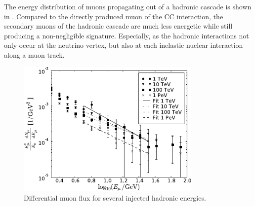 The energy distribution of muons propagating out of a hadronic cascade is shown in .
Compared to the directly produced muon of the CC interaction, the secondary muons of the hadronic cascade are much less energetic while still producing a non-negligible signature.
Especially, as the hadronic interactions not only occur at the neutrino vertex, but also at each inelastic nuclear interaction along a muon track.
\begin{figure}
    \centering
    \includegraphics[width=0.8\textwidth]{./images/muon_flux_hadronic_shower.pdf}
    \caption{Differential muon flux for several injected hadronic energies. \cite{Panknin09ICRC}}
    \label{fig:mu_flux_hadr_shower}
\end{figure}
